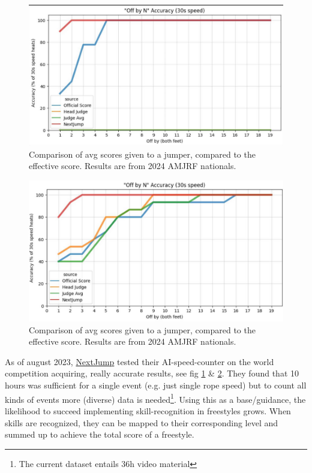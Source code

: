 \begin{figure}
    \centering
    \includegraphics[width=0.95\linewidth]{img/nextjump-off-by-feet}
    \caption[nextjump-results]{Comparison of avg scores given to a jumper, compared to the effective score. Results are from 2024 AMJRF nationals.}
    \label{fig:nextjump-results-off-by-feet}
\end{figure}

\begin{figure}
    \centering
    \includegraphics[width=0.95\linewidth]{img/nextjump-off-by-feet-judges}
    \caption[nextjump-results-multi]{Comparison of avg scores given to a jumper, compared to the effective score. Results are from 2024 AMJRF nationals.}
    \label{fig:nextjump-results-off-by-feet-judges-amjrf-2024}
\end{figure}

As of august 2023, \href{https://nextjump.app/}{NextJump} tested their AI-speed-counter on the world competition acquiring, really accurate results, see fig \ref{fig:nextjump-results-off-by-feet} \& \ref{fig:nextjump-results-off-by-feet-judges-amjrf-2024}. They found that 10 hours was sufficient for a single event (e.g. just single rope speed) but to count all kinds of events more (diverse) data is needed\footnote{The current dataset entails 36h video material}. Using this as a base/guidance, the likelihood to succeed implementing skill-recognition in freestyles grows.
When skills are recognized, they can be mapped to their corresponding level and summed up to achieve the total score of a freestyle.



